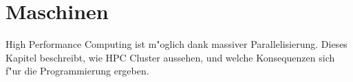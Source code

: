 \chapter{Maschinen}
High Performance Computing ist m"oglich dank massiver Parallelisierung.
Dieses Kapitel beschreibt, wie HPC Cluster aussehen, und welche Konsequenzen
sich f"ur die Programmierung ergeben.
